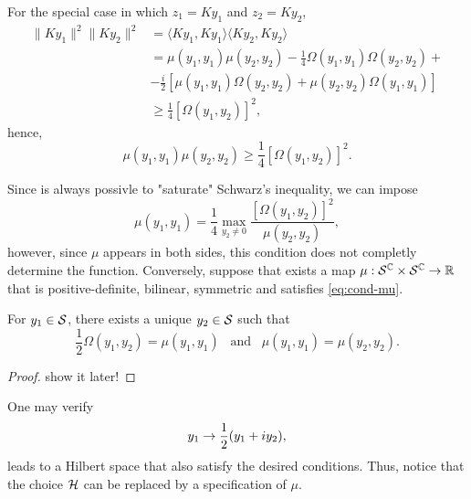For the special case in which \(z_1=Ky_1\) and \(z_2=Ky_2\), 
\begin{subequations}
    \begin{align}
        \lVert Ky_1\rVert^2\lVert Ky_2\rVert^2&=\langle Ky_1,Ky_1\rangle\langle Ky_2,Ky_2\rangle\\
        &=\mu(y_1,y_1)\mu(y_2,y_2)-\frac{1}{4}\Omega(y_1,y_1)\Omega(y_2,y_2)+\\
        &-\frac{i}{2}\left[\mu(y_1,y_1)\Omega(y_2,y_2)+\mu(y_2,y_2)\Omega(y_1,y_1)\right]\\
        &\geq \frac{1}{4}\left[\Omega(y_1,y_2)\right]^2,
    \end{align}
\end{subequations}
hence,
\begin{equation}
    \mu(y_1,y_1)\mu(y_2,y_2)\geq\frac{1}{4}\left[\Omega(y_1,y_2)\right]^2.
\end{equation}

Since is always possivle to "saturate" Schwarz's inequality, we can impose
\begin{equation}
    \mu(y_1,y_1)=\frac{1}{4}\max_{y_2\neq0}{\frac{\left[\Omega(y_1,y_2)\right]^2}{\mu(y_2,y_2)}},
    \label{eq:cond-mu}
\end{equation}
however, since \(\mu\) appears in both sides, this condition does not completly determine the function. Conversely, suppose that exists a map \(\mu:{\mathcal{S}}^{\mathbb{C}}\times{\mathcal{S}}^{\mathbb{C}}\to{\mathbb{R}}\) that is positive-definite, bilinear, symmetric and satisfies \cref{eq:cond-mu}.

\begin{proposition}
    For \(y_1\in{\mathcal{S}}\), there exists a unique \(y_2\in{\mathcal{S}}\) such that
    \begin{equation}
        \frac{1}{2}\Omega(y_1,y_2)=\mu(y_1,y_1)\;\;\;\text{and}\;\;\;\mu(y_1,y_1)=\mu(y_2,y_2).
    \end{equation}
\end{proposition}
\begin{proof}
    show it later!
\end{proof}

One may verify
\begin{equation}
    y_1\to\frac{1}{2}(y_1+iy_2),
\end{equation}
leads to a Hilbert space that also satisfy the desired conditions. Thus, notice that the choice \({\mathcal{H}}\) can be replaced by a specification of \(\mu\).
\\
\vspace{1mm}
\begin{center}
\end{center}
\let\clearpage
\newpage
\pagestyle{empty}


